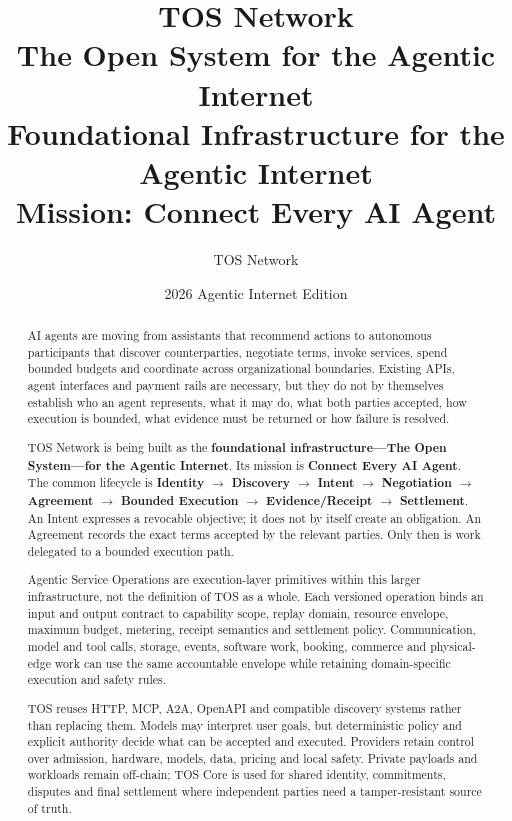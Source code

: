 \documentclass[11pt,oneside]{article}
\title{
  \textbf{TOS Network}\\[0.4em]
  \Large The Open System for the Agentic Internet\\[0.25em]
  \large Foundational Infrastructure for the Agentic Internet\\[0.2em]
  \normalsize Mission: Connect Every AI Agent
}
\author{TOS Network}
\date{2026 Agentic Internet Edition}
\begin{document}
\maketitle

\begin{abstract}
AI agents are moving from assistants that recommend actions to autonomous participants that
discover counterparties, negotiate terms, invoke services, spend bounded budgets and
coordinate across organizational boundaries. Existing APIs, agent interfaces and payment
rails are necessary, but they do not by themselves establish who an agent represents, what it
may do, what both parties accepted, how execution is bounded, what evidence must be returned
or how failure is resolved.

TOS Network is being built as the \textbf{foundational infrastructure---The Open System---for
the Agentic Internet}. Its mission is \textbf{Connect Every AI Agent}. The common lifecycle is
\textbf{Identity $\rightarrow$ Discovery $\rightarrow$ Intent $\rightarrow$ Negotiation
$\rightarrow$ Agreement $\rightarrow$ Bounded Execution $\rightarrow$ Evidence/Receipt
$\rightarrow$ Settlement}. An Intent expresses a revocable objective; it does not by itself
create an obligation. An Agreement records the exact terms accepted by the relevant parties.
Only then is work delegated to a bounded execution path.

Agentic Service Operations are execution-layer primitives within this larger infrastructure,
not the definition of TOS as a whole. Each versioned operation binds an input and output
contract to capability scope, replay domain, resource envelope, maximum budget, metering,
receipt semantics and settlement policy. Communication, model and tool calls, storage,
events, software work, booking, commerce and physical-edge work can use the same accountable
envelope while retaining domain-specific execution and safety rules.

TOS reuses HTTP, MCP, A2A, OpenAPI and compatible discovery systems rather than replacing
them. Models may interpret user goals, but deterministic policy and explicit authority decide
what can be accepted and executed. Providers retain control over admission, hardware, models,
data, pricing and local safety. Private payloads and workloads remain off-chain; TOS Core is
used for shared identity, commitments, disputes and final settlement where independent
parties need a tamper-resistant source of truth.


\end{abstract}
\end{document}
